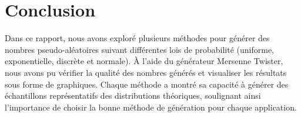 \documentclass[a4paper,12pt]{report}
\begin{document}
\newpage
\chapter*{Conclusion}
Dans ce rapport, nous avons exploré plusieurs méthodes pour générer des nombres pseudo-aléatoires suivant différentes lois de probabilité (uniforme, exponentielle, discrète et normale). À l'aide du générateur Mersenne Twister, nous avons pu vérifier la qualité des nombres générés et visualiser les résultats sous forme de graphiques. Chaque méthode a montré sa capacité à générer des échantillons représentatifs des distributions théoriques, soulignant ainsi l'importance de choisir la bonne méthode de génération pour chaque application.
\end{document}
